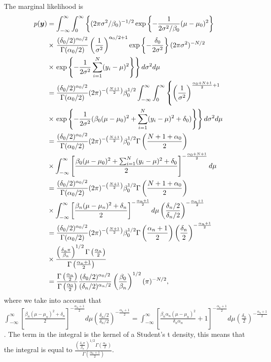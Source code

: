 \begin{enumerate}
The marginal likelihood is
\begin{align*}
	\allowdisplaybreaks
	p(\bm{y})&=\int_{-\infty}^{\infty}\int_{0}^{\infty}\left\{ (2\pi\sigma^2/\beta_0)^{-1/2}\exp\left\{-\frac{1}{2\sigma^2/\beta_0}(\mu-\mu_0)^2\right\}\right.\\
	&\times\left.\frac{(\delta_0/2)^{\alpha_0/2}}{\Gamma(\alpha_0/2)}\left(\frac{1}{\sigma^2}\right)^{\alpha_0/2+1}\exp\left\{-\frac{\delta_0}{2\sigma^2}\right\}(2\pi\sigma^2)^{-N/2}\right.\\
	&\times\left.\exp\left\{-\frac{1}{2\sigma^2}\sum_{i=1}^N(y_i-\mu)^2\right\}\right\}d\sigma^2d\mu\\
	&=\frac{(\delta_0/2)^{\alpha_0/2}}{\Gamma(\alpha_0/2)}(2\pi)^{-\left(\frac{N+1}{2}\right)}\beta_0^{1/2}\int_{-\infty}^{\infty}\int_{0}^{\infty}\left\{\left(\frac{1}{\sigma^2}\right)^{\frac{\alpha_0+N+1}{2}+1}\right.\\
	&\times\left.\exp\left\{-\frac{1}{2\sigma^2}(\beta_0(\mu-\mu_0)^2+\sum_{i=1}^N (y_i-\mu)^2+\delta_0)\right\}\right\}d\sigma^2d\mu\\
	&=\frac{(\delta_0/2)^{\alpha_0/2}}{\Gamma(\alpha_0/2)}(2\pi)^{-\left(\frac{N+1}{2}\right)}\beta_0^{1/2}\Gamma\left(\frac{N+1+\alpha_0}{2}\right)\\
	&\times \int_{-\infty}^{\infty} \left[\frac{\beta_0(\mu-\mu_0)^2+\sum_{i=1}^N(y_i-\mu)^2+\delta_0}{2}\right]^{-\frac{\alpha_0+N+1}{2}}d\mu\nonumber\\
	&=\frac{(\delta_0/2)^{\alpha_0/2}}{\Gamma(\alpha_0/2)}(2\pi)^{-\left(\frac{N+1}{2}\right)}\beta_0^{1/2}\Gamma\left(\frac{N+1+\alpha_0}{2}\right)\\
	&\times \int_{-\infty}^{\infty} \left[\frac{\beta_n(\mu-\mu_n)^2+\delta_n}{2}\right]^{-\frac{\alpha_n+1}{2}}d\mu\left(\frac{\delta_n/2}{\delta_n/2}\right)^{-\frac{\alpha_n+1}{2}}\\
	&=\frac{(\delta_0/2)^{\alpha_0/2}}{\Gamma(\alpha_0/2)}(2\pi)^{-\left(\frac{N+1}{2}\right)}\beta_0^{1/2}\Gamma\left(\frac{\alpha_n+1}{2}\right)\left(\frac{\delta_n}{2}\right)^{-\frac{\alpha_n+1}{2}}\\
	&\times \frac{\left(\frac{\delta_n\pi}{\beta_n}\right)^{1/2}\Gamma\left(\frac{\alpha_n}{2}\right)}{\Gamma\left(\frac{\alpha_n+1}{2}\right)}\\
	&=\frac{\Gamma\left(\frac{\alpha_n}{2}\right)}{\Gamma\left(\frac{\alpha_0}{2}\right)}\frac{(\delta_0/2)^{\alpha_0/2}}{(\delta_n/2)^{\alpha_n/2}}\left(\frac{\beta_0}{\beta_n}\right)^{1/2}(\pi)^{-N/2},
\end{align*}
where we take into account that $\int_{-\infty}^{\infty} \left[\frac{\beta_n(\mu-\mu_n)^2+\delta_n}{2}\right]^{-\frac{\alpha_n+1}{2}}d\mu\left(\frac{\delta_n/2}{\delta_n/2}\right)^{-\frac{\alpha_n+1}{2}}=\int_{-\infty}^{\infty} \left[\frac{\beta_n\alpha_n(\mu-\mu_n)^2}{\delta_n\alpha_n}+1\right]^{-\frac{\alpha_n+1}{2}}d\mu\left(\frac{\delta_n}{2}\right)^{-\frac{\alpha_n+1}{2}}$. The term in the integral is the kernel of a Student's t density, this means that the integral is equal to $\frac{\left(\frac{\delta_n\pi}{\beta_n}\right)^{1/2}\Gamma\left(\frac{\alpha_n}{2}\right)}{\Gamma\left(\frac{\alpha_n+1}{2}\right)}$.  


\end{enumerate}
